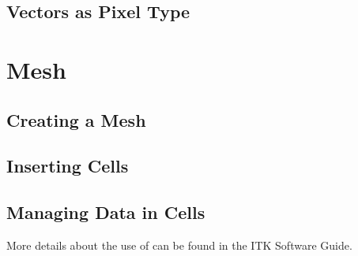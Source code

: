 %




\subsection{Vectors as Pixel Type}
\label{sec:PointSetWithVectorsAsPixelType}






%




\section{Mesh}\label{MeshSection}

\subsection{Creating a Mesh}
\label{sec:CreatingAMesh}




\subsection{Inserting Cells}
\label{sec:InsertingCellsInMesh}




\subsection{Managing Data in Cells}
\label{sec:ManagingCellDataInMesh}




More details about the use of  can be found in the
ITK Software Guide.


%



